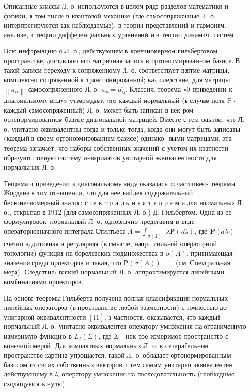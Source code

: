 \documentclass[10pt]{article}
\begin{document}
Описанные классы Л. о. используются в целом ряде разделов математики и физики, в том числе в квантовой механике (где самосопряженные Л. о. интерпретируются как наблюдаемые), в теории представлений и гармонич. анализе, в теории дифференциальных уравнений и в теории динамич. систем.



Всю информацию о Л. о., действующем в конечномерном гильбертовом пространстве, доставляет его матричная запись в ортонормированном базисе. В такой записи переходу к сопряженному Л. о. соответствует взятие матрицы, комплексно сопряженной к транспонированной; как следствие, для матрицы $\left\|a_{i j}\right\|$ самосопряженного Л. о. $a_{j i}=\overline{a_{i j}}$. Классич. теорема «0 приведении к диагональному виду» утверждает, что каждый нормальный (в случае поля $\mathbb{R}$ - каждый самосопряженный) Л. о. может быть записан в нек-ром ортонормированном базисе диагональной матрццей. Вместе с тем фактом, что Л. о. унитарно әквивалентны тогда и только тогда, когда они могут быть записаны (каждый в своем ортонормированном базисе) одинако- выми матрицами, эта теорема означает, что наборы собственных значений с учетом их кратности образуют полную систему инвариантов унитарной эквивалентности для нормальных Л. о.



Теорема о приведении к диагональному виду оказалась «счастливее» теоремы Жордана в том отношении, что для нее найден содержательный бесконечномерный аналог: с пе к т р а л ь н а я т е о р е м а для нормальных Л. о., открытая в 1912 (для самосопряженных Л. о.) Д. Гильбертом. Одна из ее формулировок: нормальный Л. о. однозначно представим в виде операторнозначного интеграла Стилтьеса $A=\int_{\sigma(A)}$ $\lambda \boldsymbol{P}(d \lambda)$, где $\boldsymbol{P}(d \lambda)$ - счетно аддитивная и регулярная (в смысле, напр., сильной операторной топологии) функция на борелевских подмножествах в $\sigma(A)$, принимающая значения среди проекторов и такая, что $\boldsymbol{P}(\sigma(A))=1$ (см. Спектральная мера). Следствие: всякий нормальный Л. о. аппроксимируется линейными комбинациями проекторов.



На основе теоремы Гильберта получена полная классификация нормальных линейных операторов (в пространстве любой размерности) с точностью до унитарной әквивалентности $[11]$; в частности, оказывается, что каждый нормальный Л. о. унитарно әквивалентен оператору умножения на ограниченную измеримую функцию в $L_{2}(\Sigma)$, где $\Sigma$ - нек-рое измеримое пространство с конечной мерой. Для компактных нормальных Л. о. в сепарабельном пространстве картина упрощается: такой Л. о. обладает ортонормированным базисом из своих собственных векторов и тем самым унитарно эквивалентен действующему в $l_{2}$ оператору умножения на последовательность (необходимо сходящуюся к нулю).
\end{document}
